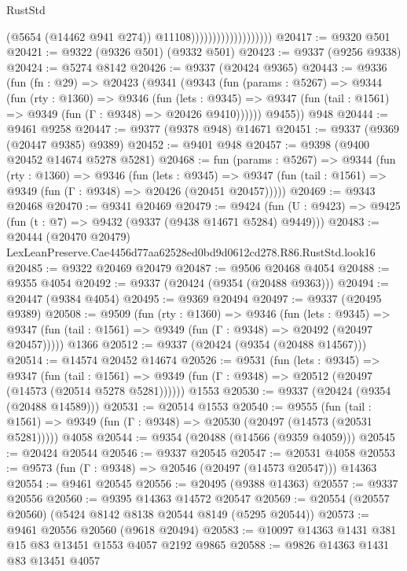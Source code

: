 \begin{lexlean}{RustStd}
\begin{coremodule}
                                          (@5654 (@14462 @941 @274))
                                          @11108)))))))))))))))))))
@20417 := @9320 @501
@20421 := @9322 (@9326 @501) (@9332 @501)
@20423 := @9337 (@9256 @9338)
@20424 := @5274 @8142
@20426 := @9337 (@20424 @9365)
@20443 := @9336
    (fun (fn : @29) =>
    @20423
      (@9341
        (@9343
          (fun (params : @5267) =>
          @9344
            (fun (rty : @1360) =>
            @9346
              (fun (lets : @9345) =>
              @9347 (fun (tail : @1561) => @9349 (fun (Γ : @9348) => @20426 @9410))))))
        @9455))
    @948
@20444 := @9461 @9258
@20447 := @9377 (@9378 @948) @14671
@20451 := @9337 (@9369 (@20447 @9385) @9389)
@20452 := @9401 @948
@20457 := @9398 (@9400 @20452 @14674 @5278 @5281)
@20468 := fun (params : @5267) =>
  @9344
    (fun (rty : @1360) =>
    @9346
      (fun (lets : @9345) =>
      @9347 (fun (tail : @1561) => @9349 (fun (Γ : @9348) => @20426 (@20451 @20457)))))
@20469 := @9343 @20468
@20470 := @9341 @20469
@20479 := @9424
    (fun (U : @9423) => @9425 (fun (t : @7) => @9432 (@9337 (@9438 @14671 @5284) @9449)))
@20483 := @20444
    (@20470 @20479)
    LexLeanPreserve.Cae4456d77aa62528ed0bd9d0612cd278.R86.RustStd.look16
@20485 := @9322 @20469 @20479
@20487 := @9506 @20468 @4054
@20488 := @9355 @4054
@20492 := @9337 (@20424 (@9354 (@20488 @9363)))
@20494 := @20447 (@9384 @4054)
@20495 := @9369 @20494
@20497 := @9337 (@20495 @9389)
@20508 := @9509
    (fun (rty : @1360) =>
    @9346
      (fun (lets : @9345) =>
      @9347 (fun (tail : @1561) => @9349 (fun (Γ : @9348) => @20492 (@20497 @20457)))))
    @1366
@20512 := @9337 (@20424 (@9354 (@20488 @14567)))
@20514 := @14574 @20452 @14674
@20526 := @9531
    (fun (lets : @9345) =>
    @9347
      (fun (tail : @1561) =>
      @9349 (fun (Γ : @9348) => @20512 (@20497 (@14573 (@20514 @5278 @5281))))))
    @1553
@20530 := @9337 (@20424 (@9354 (@20488 @14589)))
@20531 := @20514 @1553
@20540 := @9555
    (fun (tail : @1561) => @9349 (fun (Γ : @9348) => @20530 (@20497 (@14573 (@20531 @5281)))))
    @4058
@20544 := @9354 (@20488 (@14566 (@9359 @4059)))
@20545 := @20424 @20544
@20546 := @9337 @20545
@20547 := @20531 @4058
@20553 := @9573 (fun (Γ : @9348) => @20546 (@20497 (@14573 @20547))) @14363
@20554 := @9461 @20545
@20556 := @20495 (@9388 @14363)
@20557 := @9337 @20556
@20560 := @9395 @14363 @14572 @20547
@20569 := @20554 (@20557 @20560) (@5424 @8142 @8138 @20544 @8149 (@5295 @20544))
@20573 := @9461 @20556 @20560 (@9618 @20494)
@20583 := @10097 @14363 @1431 @381 @15 @83 @13451 @1553 @4057 @2192 @9865
@20588 := @9826 @14363 @1431 @83 @13451 @4057

\end{coremodule}
\end{lexlean}
